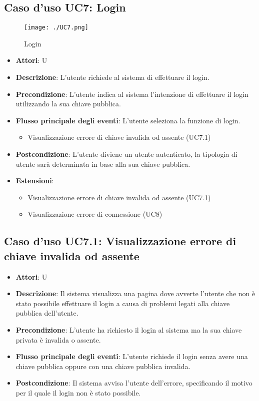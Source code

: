 \subsection{Caso d'uso \hypertarget{UC7}{UC7}: Login}
\begin{figure} [H]
\centering
\texttt{[image: ./UC7.png]}
\caption{Login}\label{}
\end{figure}
\begin{itemize}
\item \textbf{Attori}: U
\item \textbf{Descrizione}: L'utente richiede al sistema di effettuare il login.
\item \textbf{Precondizione}: L'utente indica al sistema l'intenzione di effettuare il login utilizzando la sua chiave pubblica.
\item \textbf{Flusso principale degli eventi}: L'utente seleziona la funzione di login.
\begin{itemize}
\item Visualizzazione errore di chiave invalida od assente (UC7.1)
\end{itemize}
\item \textbf{Postcondizione}: L'utente diviene un utente autenticato, la tipologia di utente sarà determinata in base alla sua chiave pubblica.
\item \textbf{Estensioni}:
\begin{itemize}
\item Visualizzazione errore di chiave invalida od assente (UC7.1)
\item Visualizzazione errore di connessione (UC8)
\end{itemize}
\end{itemize}
\subsection{Caso d'uso \hypertarget{UC7.1}{UC7.1}: Visualizzazione errore di chiave invalida od assente}
\begin{itemize}
\item \textbf{Attori}: U
\item \textbf{Descrizione}: Il sistema visualizza una pagina dove avverte l'utente che non è stato possibile effettuare il login a causa di problemi legati alla chiave pubblica dell'utente.
\item \textbf{Precondizione}: L'utente ha richiesto il login al sistema ma la sua chiave privata è invalida o assente.
\item \textbf{Flusso principale degli eventi}: L'utente richiede il login senza avere una chiave pubblica oppure con una chiave pubblica invalida.
\item \textbf{Postcondizione}: Il sistema avvisa l'utente dell'errore, specificando il motivo per il quale il login non è stato possibile.
\end{itemize}
